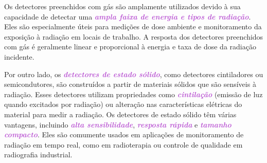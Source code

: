 \documentclass[11pt,a4paper]{article}
\begin{document}
	Os detectores preenchidos com gás são amplamente utilizados devido à sua capacidade de detectar uma \textcolor{MediumOrchid}{\textit{\textbf{ampla faixa de energia e tipos de radiação}}}. Eles são especialmente úteis para medições de dose ambiente e monitoramento da exposição à radiação em locais de trabalho. A resposta dos detectores preenchidos com gás é geralmente linear e proporcional à energia e taxa de dose da radiação incidente.

	Por outro lado, os \textcolor{MediumOrchid}{\textit{\textbf{detectores de estado sólido}}}, como detectores cintiladores ou semicondutores, são construídos a partir de materiais sólidos que são sensíveis à radiação. Esses detectores utilizam propriedades como \textcolor{MediumOrchid}{\textit{\textbf{cintilação}}} (emissão de luz quando excitados por radiação) ou alteração nas características elétricas do material para medir a radiação. Os detectores de estado sólido têm várias vantagens, incluindo \textcolor{MediumOrchid}{\textit{\textbf{alta sensibilidade}}}, \textcolor{MediumOrchid}{\textit{\textbf{resposta rápida}}} e \textcolor{MediumOrchid}{\textit{\textbf{tamanho compacto}}}. Eles são comumente usados em aplicações de monitoramento de radiação em tempo real, como em radioterapia ou controle de qualidade em radiografia industrial.
\end{document}
